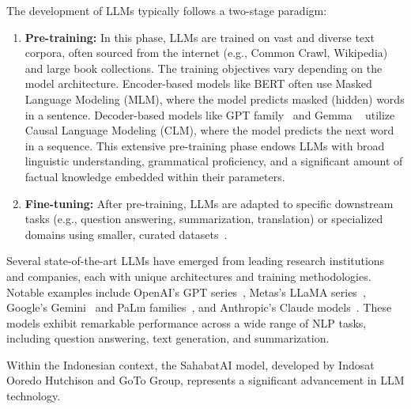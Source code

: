 \documentclass[12pt]{report}
\begin{document}
The development of LLMs typically follows a two-stage paradigm:
\begin{enumerate}
    \item \textbf{Pre-training:} In this phase, LLMs are trained on vast and diverse text corpora, often sourced from the internet (e.g., Common Crawl, Wikipedia) and large book collections. The training objectives vary depending on the model architecture. Encoder-based models like BERT often use Masked Language Modeling (MLM), where the model predicts masked (hidden) words in a sentence. Decoder-based models like GPT family~\cite{radford2018improving,radford2019language,brown2020languagemodelsfewshotlearners} and Gemma ~\cite{gemmateam2024gemmaopenmodelsbased} utilize Causal Language Modeling (CLM), where the model predicts the next word in a sequence. This extensive pre-training phase endows LLMs with broad linguistic understanding, grammatical proficiency, and a significant amount of factual knowledge embedded within their parameters. 
    \item \textbf{Fine-tuning:} After pre-training, LLMs are adapted to specific downstream tasks (e.g., question answering, summarization, translation) or specialized domains using smaller, curated datasets~\cite{weng2024navigatinglandscapelargelanguage}.
\end{enumerate}

Several state-of-the-art LLMs have emerged from leading research institutions and companies, each with unique architectures and training methodologies. Notable examples include OpenAI's GPT series~\cite{openai2024gpt4technicalreport}, Metas's LLaMA series~\cite{touvron2023llama2openfoundation}, Google's Gemini~\cite{geminiteam2025geminifamilyhighlycapable} and PaLm families~\cite{chowdhery2022palmscalinglanguagemodeling}, and Anthropic's Claude models~\cite{anthropic2025claude37}. These models exhibit remarkable performance across a wide range of NLP tasks, including question answering, text generation, and summarization.

Within the Indonesian context, the SahabatAI model, developed by Indosat Ooredo Hutchison and GoTo Group, represents a significant advancement in LLM technology. 
\end{document}

